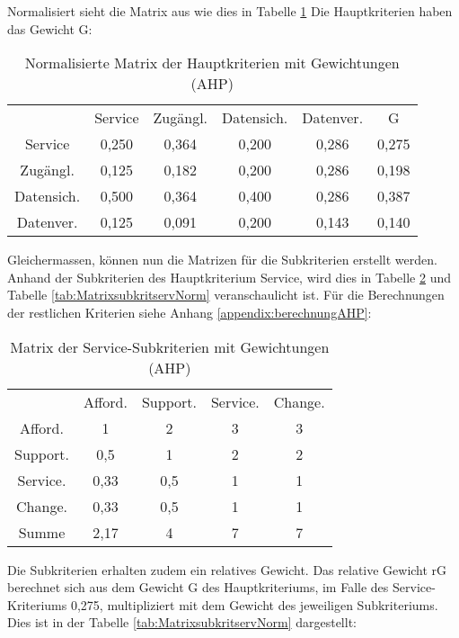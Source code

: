Normalisiert sieht die Matrix aus wie dies in Tabelle \ref{tab:MatrixHauptkriterienGewicht} Die Hauptkriterien haben das Gewicht G: 
\begin{table}[h]
	\centering
\begin{tabular}{cccccc}
  & Service & Zugängl. & Datensich. & Datenver. & G \\
  Service & 0,250 & 0,364 & 0,200 & 0,286 & 0,275 \\
  Zugängl. & 0,125 & 0,182 & 0,200 & 0,286 & 0,198 \\
  Datensich. & 0,500 & 0,364 & 0,400 & 0,286 & 0,387 \\
  Datenver. & 0,125 & 0,091 & 0,200 & 0,143 & 0,140 \\
  \end{tabular} 
  \caption{Normalisierte Matrix der Hauptkriterien mit Gewichtungen (AHP)}
\label{tab:MatrixHauptkriterienGewicht}
\end{table}	

Gleichermassen, können nun die Matrizen für die Subkriterien erstellt werden. Anhand der Subkriterien des Hauptkriterium Service, wird dies in Tabelle \ref{tab:Matrixsubkritserv} und Tabelle \ref{tab:MatrixsubkritservNorm} veranschaulicht ist. Für die Berechnungen der restlichen Kriterien siehe Anhang \ref{appendix:berechnungAHP}:

\begin{table}[h]
	\centering
\begin{tabular}{ccccc}
  & Afford. & Support. & Service. & Change. \\
  Afford. & 1 & 2 & 3 & 3 \\
  Support. & 0,5 & 1 & 2 & 2 \\
  Service. & 0,33 & 0,5 & 1 & 1 \\
  Change. & 0,33 & 0,5 & 1 & 1 \\
  Summe & 2,17 & 4 & 7 & 7 \\
\end{tabular} 
\caption{Matrix der Service-Subkriterien mit Gewichtungen (AHP)}
\label{tab:Matrixsubkritserv}
\end{table}

Die Subkriterien erhalten zudem ein relatives Gewicht. Das relative Gewicht rG berechnet sich aus dem Gewicht G des Hauptkriteriums, im Falle des Service-Kriteriums 0,275, multipliziert mit dem Gewicht des jeweiligen Subkriteriums. Dies ist in der Tabelle \ref{tab:MatrixsubkritservNorm} dargestellt:

